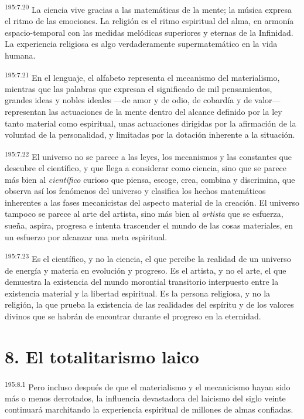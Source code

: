 \par
\textsuperscript{195:7.20} La ciencia vive gracias a las matemáticas de la mente; la música expresa el ritmo de las emociones. La religión es el ritmo espiritual del alma, en armonía espacio-temporal con las medidas melódicas superiores y eternas de la Infinidad. La experiencia religiosa es algo verdaderamente supermatemático en la vida humana.

\par
\textsuperscript{195:7.21} En el lenguaje, el alfabeto representa el mecanismo del materialismo, mientras que las palabras que expresan el significado de mil pensamientos, grandes ideas y nobles ideales ---de amor y de odio, de cobardía y de valor--- representan las actuaciones de la mente dentro del alcance definido por la ley tanto material como espiritual, unas actuaciones dirigidas por la afirmación de la voluntad de la personalidad, y limitadas por la dotación inherente a la situación.

\par
\textsuperscript{195:7.22} El universo no se parece a las leyes, los mecanismos y las constantes que descubre el científico, y que llega a considerar como ciencia, sino que se parece más bien al \textit{científico} curioso que piensa, escoge, crea, combina y discrimina, que observa así los fenómenos del universo y clasifica los hechos matemáticos inherentes a las fases mecanicistas del aspecto material de la creación. El universo tampoco se parece al arte del artista, sino más bien al \textit{artista} que se esfuerza, sueña, aspira, progresa e intenta trascender el mundo de las cosas materiales, en un esfuerzo por alcanzar una meta espiritual.

\par
\textsuperscript{195:7.23} Es el científico, y no la ciencia, el que percibe la realidad de un universo de energía y materia en evolución y progreso. Es el artista, y no el arte, el que demuestra la existencia del mundo morontial transitorio interpuesto entre la existencia material y la libertad espiritual. Es la persona religiosa, y no la religión, la que prueba la existencia de las realidades del espíritu y de los valores divinos que se habrán de encontrar durante el progreso en la eternidad.

\section*{8. El totalitarismo laico}
\par
\textsuperscript{195:8.1} Pero incluso después de que el materialismo y el mecanicismo hayan sido más o menos derrotados, la influencia devastadora del laicismo del siglo veinte continuará marchitando la experiencia espiritual de millones de almas confiadas.


